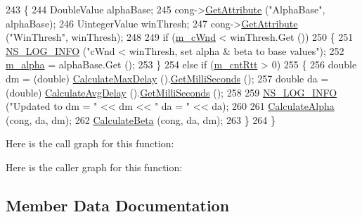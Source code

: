 \begin{DoxyCode}
243 \{
244   DoubleValue alphaBase;
245   cong->\hyperlink{classns3_1_1ObjectBase_a895d1de2f96063d0e0fd78463e7a7e30}{GetAttribute} (\textcolor{stringliteral}{"AlphaBase"}, alphaBase);
246   UintegerValue winThresh;
247   cong->\hyperlink{classns3_1_1ObjectBase_a895d1de2f96063d0e0fd78463e7a7e30}{GetAttribute} (\textcolor{stringliteral}{"WinThresh"}, winThresh);
248 
249   \textcolor{keywordflow}{if} (\hyperlink{classTcpIllinoisTest_aa043b73084f6df13d4f66e3883f17f04}{m\_cWnd} < winThresh.Get ())
250     \{
251       \hyperlink{group__logging_gafbd73ee2cf9f26b319f49086d8e860fb}{NS\_LOG\_INFO} (\textcolor{stringliteral}{"cWnd < winThresh, set alpha & beta to base values"});
252       \hyperlink{classTcpIllinoisTest_ad2a9a93f32ddcb3183cdb1168435e82d}{m\_alpha} = alphaBase.Get ();
253     \}
254   \textcolor{keywordflow}{else} \textcolor{keywordflow}{if} (\hyperlink{classTcpIllinoisTest_a90c562721676a1bd3fb50c12d54fe726}{m\_cntRtt} > 0)
255     \{
256       \textcolor{keywordtype}{double} dm = (double) \hyperlink{classTcpIllinoisTest_a18563a2afdc122d52e5830704cb43f91}{CalculateMaxDelay} ().\hyperlink{classns3_1_1Time_aba3428a8b6c4c8d9014ce44145081f34}{GetMilliSeconds} ();
257       \textcolor{keywordtype}{double} da = (double) \hyperlink{classTcpIllinoisTest_a028852f10ed6ca5a1909294132a5e965}{CalculateAvgDelay} ().\hyperlink{classns3_1_1Time_aba3428a8b6c4c8d9014ce44145081f34}{GetMilliSeconds} ();
258 
259       \hyperlink{group__logging_gafbd73ee2cf9f26b319f49086d8e860fb}{NS\_LOG\_INFO} (\textcolor{stringliteral}{"Updated to dm = "} << dm << \textcolor{stringliteral}{" da = "} << da);
260 
261       \hyperlink{classTcpIllinoisTest_a268dc2c39fcfc617ad967b5762e4f235}{CalculateAlpha} (cong, da, dm);
262       \hyperlink{classTcpIllinoisTest_aa20729ec761d54b2faba82f0db597d89}{CalculateBeta} (cong, da, dm);
263     \}
264 \}
\end{DoxyCode}


Here is the call graph for this function\+:




Here is the caller graph for this function\+:




\subsection{Member Data Documentation}

